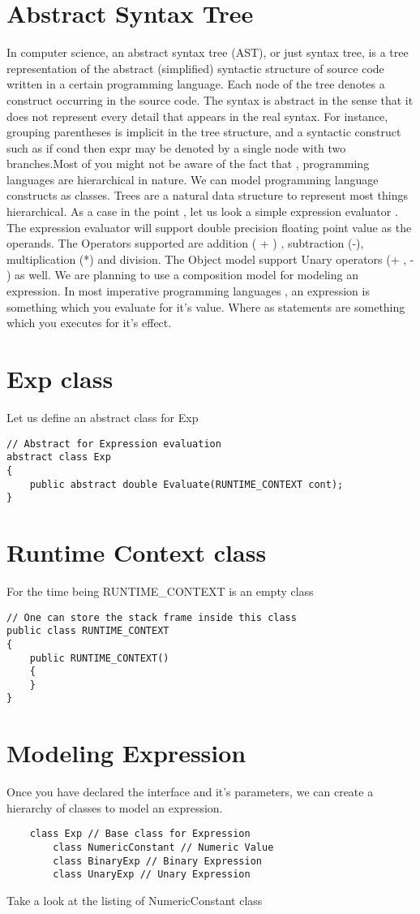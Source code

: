 \clearpage
\section{Abstract Syntax Tree}
In computer science, an abstract syntax tree (AST), or just syntax tree, is a tree representation of the abstract (simplified) syntactic structure of source code written in a certain programming language. Each node of the tree denotes a construct occurring in the source code. The syntax is abstract in the sense that it does not represent every detail that appears in the real syntax. For instance, grouping parentheses is implicit in the tree structure, and a syntactic construct such as if cond then expr may be denoted by a single node with two branches.Most of you might not be aware of the fact that , programming languages are hierarchical in nature. We can model programming language constructs as classes. Trees are a natural data structure to represent
most things hierarchical. As a case in the point , let us look a simple expression evaluator . The expression evaluator will support double
precision floating point value as the operands.  The Operators supported are addition ( + ) , subtraction (-), multiplication (*) and division. The Object model support Unary operators (+ , - ) as well. We are planning to use a composition model for modeling an expression. In most imperative programming languages , an expression is something which you evaluate for it's value. Where
as statements are something which you executes for it's effect.
\clearpage
\section{Exp class}
Let us define an abstract class for Exp
\lstset{style=csharp}
\begin{lstlisting}
// Abstract for Expression evaluation
abstract class Exp
{
	public abstract double Evaluate(RUNTIME_CONTEXT cont);
}
\end{lstlisting}
\section{Runtime Context class}
For the time being RUNTIME\_CONTEXT is an empty class
\lstset{style=csharp}
\begin{lstlisting}
// One can store the stack frame inside this class
public class RUNTIME_CONTEXT
{
	public RUNTIME_CONTEXT()
	{
	}
}
\end{lstlisting}
\section{Modeling Expression}
Once you have declared the interface and it's parameters, we can create a hierarchy of classes to model an expression.
\begin{verbatim}
	class Exp // Base class for Expression
		class NumericConstant // Numeric Value
		class BinaryExp // Binary Expression
		class UnaryExp // Unary Expression
\end{verbatim}
Take a look at the listing of NumericConstant class
\clearpage
